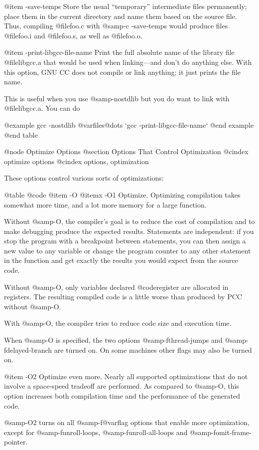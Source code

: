 {@item -save-temps
Store the usual ``temporary'' intermediate files permanently; place them
in the current directory and name them based on the source file.  Thus,
compiling @file{foo.c} with @samp{-c -save-temps} would produce files
@file{foo.i} and @file{foo.s}, as well as @file{foo.o}.

@item -print-libgcc-file-name
Print the full absolute name of the library file @file{libgcc.a} that
would be used when linking---and don't do anything else.  With this
option, GNU CC does not compile or link anything; it just prints the
file name.

This is useful when you use @samp{-nostdlib} but you do want to link
with @file{libgcc.a}.  You can do

@example
gcc -nostdlib @var{files}@dots{} `gcc -print-libgcc-file-name`
@end example
@end table

@node Optimize Options
@section Options That Control Optimization
@cindex optimize options
@cindex options, optimization

These options control various sorts of optimizations:

@table @code
@item -O
@itemx -O1
Optimize.  Optimizing compilation takes somewhat more time, and a lot
more memory for a large function.

Without @samp{-O}, the compiler's goal is to reduce the cost of
compilation and to make debugging produce the expected results.
Statements are independent: if you stop the program with a breakpoint
between statements, you can then assign a new value to any variable or
change the program counter to any other statement in the function and
get exactly the results you would expect from the source code.

Without @samp{-O}, only variables declared @code{register} are
allocated in registers.  The resulting compiled code is a little worse
than produced by PCC without @samp{-O}.

With @samp{-O}, the compiler tries to reduce code size and execution
time.

When @samp{-O} is specified, the two options @samp{-fthread-jumps} and
@samp{-fdelayed-branch} are turned on.  On some machines other flags may
also be turned on.

@item -O2
Optimize even more.  Nearly all supported optimizations that do not
involve a space-speed tradeoff are performed.  As compared to @samp{-O},
this option increases both compilation time and the performance of the
generated code.

@samp{-O2} turns on all @samp{-f@var{flag}} options that enable more
optimization, except for @samp{-funroll-loops},
@samp{-funroll-all-loops} and @samp{-fomit-frame-pointer}.

}
